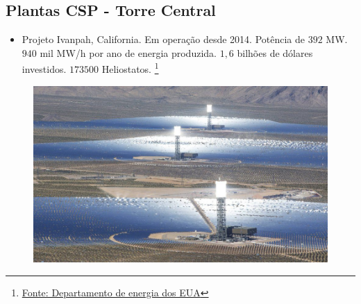 \documentclass[12pt,notheorems,hyperref={pdfauthor=Professor Rafael Nardi}]{beamer}
\begin{document}
\subsection{Plantas CSP - Torre Central}


\begin{frame}%

	\begin{itemize} \item Projeto Ivanpah, California. Em operação desde 2014.
		Potência de $392$ MW. $940$ mil MW/h por ano de energia produzida. $1,6$
		bilhões de dólares investidos. $173500$ Heliostatos.
\footnote{ \href{https://www.energy.gov/lpo/ivanpah}{Fonte: Departamento de energia dos EUA}} \end{itemize}

	\begin{figure}
		\centering
		\includegraphics[scale=0.3]{./Ivanpah4-960x576.jpg}
	\end{figure}

\end{frame}
\end{document}
